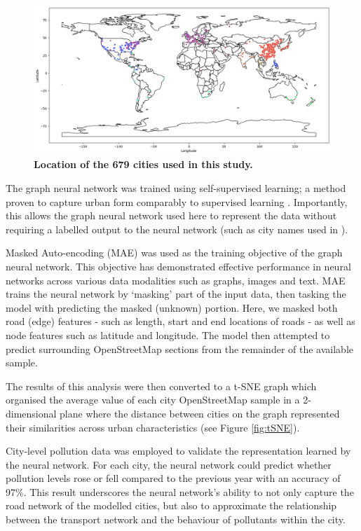 \documentclass[preprint,12pt]{elsarticle}
\begin{document}
\begin{figure}
\centering
\includegraphics[trim={0 0 0 0},clip,scale=0.4]{Images/ByCountry_map_Zeigler.png}
\caption{\bf Location of the 679 cities used in this study.}
 \label{fig:clusters}
\end{figure}


The graph neural network was trained using self-supervised learning; a method proven to capture urban form comparably to supervised learning \cite{seneviratne2021self}. Importantly, this allows the graph neural network used here to represent the data without requiring a labelled output to the neural network (such as city names used in \cite{Thompson2020}).

Masked Auto-encoding (MAE) was used as the training objective of the graph neural network. This objective has demonstrated effective performance in neural networks across various data modalities such as graphs\cite{hou2022graphmae}, images\cite{he2022masked} and text\cite{devlin2018bert}. MAE trains the neural network by `masking' part of the input data, then tasking the model with predicting the masked (unknown) portion. Here, we masked both road (edge) features - such as length, start and end locations of roads - as well as node features such as latitude and longitude. The model then attempted to predict surrounding OpenStreetMap sections from the remainder of the available sample. 

The results of this analysis were then converted to a t-SNE graph which organised the average value of each city OpenStreetMap sample in a 2-dimensional plane where the distance between cities on the graph represented their similarities across urban characteristics (see Figure \ref{fig:tSNE}).

City-level pollution data was employed to validate the representation learned by the neural network. For each city, the neural network could predict whether pollution levels rose or fell compared to the previous year with an accuracy of 97\%. This result underscores the neural network's ability to not only capture the road network of the modelled cities, but also to approximate the relationship between the transport network and the behaviour of pollutants within the city.
\end{document}
